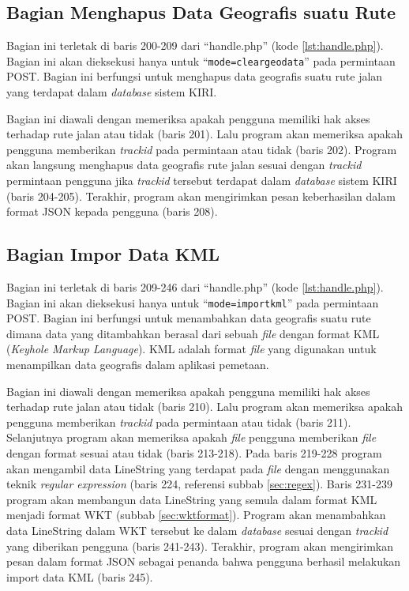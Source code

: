 \subsection{Bagian Menghapus Data Geografis suatu Rute}
\label{sec:hapusdatageografis}
Bagian ini terletak di baris 200-209 dari ``handle.php'' (kode \ref{lst:handle.php}). Bagian ini akan dieksekusi hanya untuk ``\texttt{mode=cleargeodata}'' pada permintaan POST. Bagian ini berfungsi untuk menghapus data geografis suatu rute jalan yang terdapat dalam \textit{database} sistem KIRI.

Bagian ini diawali dengan memeriksa apakah pengguna memiliki hak akses terhadap rute jalan atau tidak (baris 201). Lalu program akan memeriksa apakah pengguna memberikan \textit{trackid} pada permintaan atau tidak (baris 202). Program akan langsung menghapus data geografis rute jalan sesuai dengan \textit{trackid} permintaan pengguna jika \textit{trackid} tersebut terdapat dalam \textit{database} sistem KIRI (baris 204-205). Terakhir, program akan mengirimkan pesan keberhasilan dalam format JSON kepada pengguna (baris 208).

\subsection{Bagian Impor Data KML}
\label{sec:imporkml}
Bagian ini terletak di baris 209-246 dari ``handle.php'' (kode \ref{lst:handle.php}). Bagian ini akan dieksekusi hanya untuk ``\texttt{mode=importkml}'' pada permintaan POST. Bagian ini berfungsi untuk menambahkan data geografis suatu rute dimana data yang ditambahkan berasal dari sebuah \textit{file} dengan format KML (\textit{Keyhole Markup Language}). KML adalah format \textit{file} yang digunakan untuk menampilkan data geografis dalam aplikasi pemetaan\cite{kml}. 

Bagian ini diawali dengan memeriksa apakah pengguna memiliki hak akses terhadap rute jalan atau tidak (baris 210). Lalu program akan memeriksa apakah pengguna memberikan \textit{trackid} pada permintaan atau tidak (baris 211). Selanjutnya program akan memeriksa apakah \textit{file} pengguna memberikan \textit{file} dengan format sesuai atau tidak (baris 213-218). Pada baris 219-228 program akan mengambil data LineString yang terdapat pada \textit{file} dengan menggunakan teknik \textit{regular expression} (baris 224, referensi subbab \ref{sec:regex}). Baris 231-239 program akan membangun data LineString yang semula dalam format KML menjadi format WKT (subbab \ref{sec:wktformat}). Program akan menambahkan data LineString dalam WKT tersebut ke dalam \textit{database} sesuai dengan \textit{trackid} yang diberikan pengguna (baris 241-243). Terakhir, program akan mengirimkan pesan dalam format JSON sebagai penanda bahwa pengguna berhasil melakukan import data KML (baris 245).

